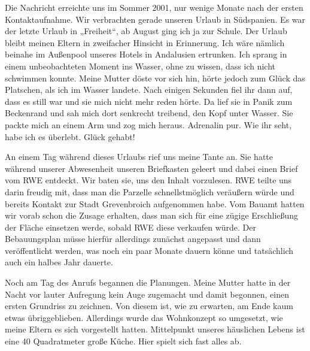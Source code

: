 \documentclass[fontsize=14pt,a4paper,headinclude,DIV=calc,automark]{scrbook}
\begin{document}
Die Nachricht erreichte uns im Sommer 2001, nur wenige Monate nach der ersten Kontaktaufnahme. Wir verbrachten gerade unseren Urlaub in Südspanien. Es war der letzte Urlaub in „Freiheit“, ab August ging ich ja zur Schule. Der Urlaub bleibt meinen Eltern in zweifacher Hinsicht in Erinnerung. Ich wäre nämlich beinahe im Außenpool unseres Hotels in Andalusien ertrunken. Ich sprang in einem unbeobachteten Moment ins Wasser, ohne zu wissen, dass ich nicht schwimmen konnte. Meine Mutter döste vor sich hin, hörte jedoch zum Glück das Platschen, als ich im Wasser landete. Nach einigen Sekunden fiel ihr dann auf, dass es still war und sie mich nicht mehr reden hörte. Da lief sie in Panik zum Beckenrand und sah mich dort senkrecht treibend, den Kopf unter Wasser. Sie packte mich an einem Arm und zog mich heraus. Adrenalin pur. Wie ihr seht, habe ich es überlebt. Glück gehabt!

An einem Tag während dieses Urlaubs rief uns meine Tante an. Sie hatte während unserer Abwesenheit unseren Briefkasten geleert und dabei einen Brief vom RWE entdeckt. Wir baten sie, uns den Inhalt vorzulesen. RWE teilte uns darin freudig mit, dass man die Parzelle schnellstmöglich veräußern würde und bereits Kontakt zur Stadt Grevenbroich aufgenommen habe. Vom Bauamt hatten wir vorab schon die Zusage erhalten, dass man sich für eine zügige Erschließung der Fläche einsetzen werde, sobald RWE diese verkaufen würde. Der Bebauungsplan müsse hierfür allerdings zunächst angepasst und dann veröffentlicht werden, was noch ein paar Monate dauern könne und tatsächlich auch ein halbes Jahr dauerte.

Noch am Tag des Anrufs begannen die Planungen. Meine Mutter hatte in der Nacht vor lauter Aufregung kein Auge zugemacht und damit begonnen, einen ersten Grundriss zu zeichnen. Von diesem ist, wie zu erwarten, am Ende kaum etwas übriggeblieben. Allerdings wurde das Wohnkonzept so umgesetzt, wie meine Eltern es sich vorgestellt hatten. Mittelpunkt unseres häuslichen Lebens ist eine 40 Quadratmeter große Küche. Hier spielt sich fast alles ab.
\end{document}
